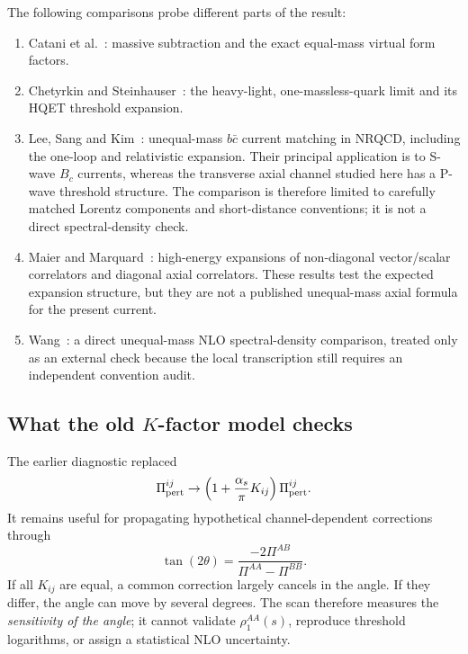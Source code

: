 \documentclass[11pt]{article}
\newcommand{\as}{\alpha_s}
\begin{document}
The following comparisons probe different parts of the result:
\begin{enumerate}
 \item Catani et al.~\cite{Catani2002}: massive subtraction and the exact
 equal-mass virtual form factors.
 \item Chetyrkin and Steinhauser~\cite{ChetyrkinSteinhauser2001}: the
 heavy-light, one-massless-quark limit and its HQET threshold expansion.
 \item Lee, Sang and Kim~\cite{LeeSangKim2010}: unequal-mass
 \(b\bar c\) current matching in NRQCD, including the one-loop and
 relativistic expansion.  Their principal application is to S-wave
 \(B_c\) currents, whereas the transverse axial channel studied here has a
 P-wave threshold structure.  The comparison is therefore limited to
 carefully matched Lorentz components and short-distance conventions; it is
 not a direct spectral-density check.
 \item Maier and Marquard~\cite{MaierMarquard2011}: high-energy expansions
 of non-diagonal vector/scalar correlators and diagonal axial correlators.
 These results test the expected expansion structure, but they are not a
 published unequal-mass axial formula for the present current.
 \item Wang~\cite{Wang2013}: a direct unequal-mass NLO spectral-density
 comparison, treated only as an external check because the local
 transcription still requires an independent convention audit.
\end{enumerate}

\subsection{What the old \(K\)-factor model checks}

The earlier diagnostic replaced
\begin{equation}
 \Pi_{\rm pert}^{ij}\to
 \left(1+\frac{\as}{\pi}K_{ij}\right)\Pi_{\rm pert}^{ij}.
\end{equation}
It remains useful for propagating hypothetical channel-dependent corrections
through
\begin{equation}
 \tan(2\theta)=
 \frac{-2\Pi^{AB}}{\Pi^{AA}-\Pi^{BB}}.
\end{equation}
If all \(K_{ij}\) are equal, a common correction largely cancels in the
angle.  If they differ, the angle can move by several degrees.  The scan
therefore measures the \emph{sensitivity of the angle}; it cannot validate
\(\rho_1^{AA}(s)\), reproduce threshold logarithms, or assign a statistical
NLO uncertainty.
\end{document}
